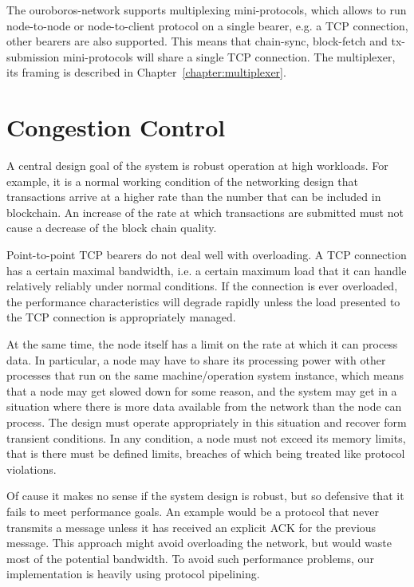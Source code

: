 The ouroboros-network supports multiplexing mini-protocols, which allows to run
node-to-node or node-to-client protocol on a single bearer, e.g. a TCP
connection, other bearers are also supported.  This means that chain-sync,
block-fetch and tx-submission mini-protocols will share a single TCP
connection.  The multiplexer, its framing is described in
Chapter~\ref{chapter:multiplexer}.

\section{Congestion Control}
A central design goal of the system is robust operation at high workloads.  For
example, it is a normal working condition of the networking design that
transactions arrive at a higher rate than the number that can be included in
blockchain.  An increase of the rate at which transactions are submitted must
not cause a decrease of the block chain quality.

Point-to-point TCP bearers do not deal well with overloading.  A TCP connection
has a certain maximal bandwidth, i.e. a certain maximum load that it can handle
relatively reliably under normal conditions.  If the connection is ever
overloaded, the performance characteristics will degrade rapidly unless the
load presented to the TCP connection is appropriately managed.

At the same time, the node itself has a limit on the rate at which it can
process data.  In particular, a node may have to share its processing power
with other processes that run on the same machine/operation system instance,
which means that a node may get slowed down for some reason, and the system may
get in a situation where there is more data available from the network than the
node can process.  The design must operate appropriately in this situation and
recover form transient conditions.  In any condition, a node must not exceed
its memory limits, that is there must be defined limits, breaches of which
being treated like protocol violations.

Of cause it makes no sense if the system design is robust, but so defensive
that it fails to meet performance goals.  An example would be a protocol that
never transmits a message unless it has received an explicit ACK for the
previous message. This approach might avoid overloading the network, but would
waste most of the potential bandwidth.  To avoid such performance problems, our
implementation is heavily using protocol pipelining.


